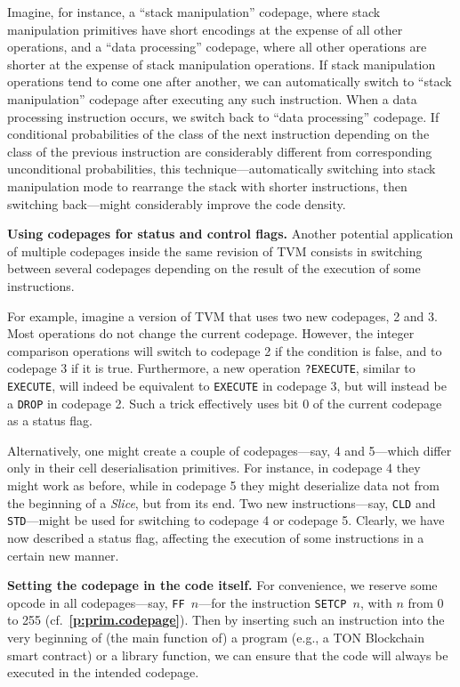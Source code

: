 \documentclass[12pt,oneside]{article}
\def\makepoint#1{\medbreak\noindent{\bf #1.\ }}
\def\nxsubpoint{\refstepcounter{subsubsection}%
    \smallbreak\makepoint{\thesubsubsection}}
\def\refpoint#1{{\rm\textbf{\ref{#1}}}}
\let\ptref=\refpoint
\def\emb#1{\textbf{#1.}}
\begin{document}
Imagine, for instance, a ``stack manipulation'' codepage, where stack manipulation primitives have short encodings at the expense of all other operations, and a ``data processing'' codepage, where all other operations are shorter at the expense of stack manipulation operations. If stack manipulation operations tend to come one after another, we can automatically switch to ``stack manipulation'' codepage after executing any such instruction. When a data processing instruction occurs, we switch back to ``data processing'' codepage. If conditional probabilities of the class of the next instruction depending on the class of the previous instruction are considerably different from corresponding unconditional probabilities, this technique---automatically switching into stack manipulation mode to rearrange the stack with shorter instructions, then switching back---might considerably improve the code density.

\nxsubpoint\emb{Using codepages for status and control flags}
Another potential application of multiple codepages inside the same revision of TVM consists in switching between several codepages depending on the result of the execution of some instructions.

For example, imagine a version of TVM that uses two new codepages, 2 and 3. Most operations do not change the current codepage. However, the integer comparison operations will switch to codepage 2 if the condition is false, and to codepage 3 if it is true. Furthermore, a new operation {\tt ?EXECUTE}, similar to {\tt EXECUTE}, will indeed be equivalent to {\tt EXECUTE} in codepage 3, but will instead be a {\tt DROP} in codepage 2. Such a trick effectively uses bit 0 of the current codepage as a status flag.

Alternatively, one might create a couple of codepages---say, 4 and 5---which differ only in their cell deserialisation primitives. For instance, in codepage 4 they might work as before, while in codepage 5 they might deserialize data not from the beginning of a {\em Slice}, but from its end. Two new instructions---say, {\tt CLD} and {\tt STD}---might be used for switching to codepage 4 or codepage 5. Clearly, we have now described a status flag, affecting the execution of some instructions in a certain new manner.

\nxsubpoint\emb{Setting the codepage in the code itself}\label{sp:setcp.opc}
For convenience, we reserve some opcode in all codepages---say, {\tt FF $n$}---for the instruction {\tt SETCP $n$}, with $n$ from 0 to 255 (cf.~\ptref{p:prim.codepage}). Then by inserting such an instruction into the very beginning of (the main function of) a program (e.g., a TON Blockchain smart contract) or a library function, we can ensure that the code will always be executed in the intended codepage.
\end{document}
